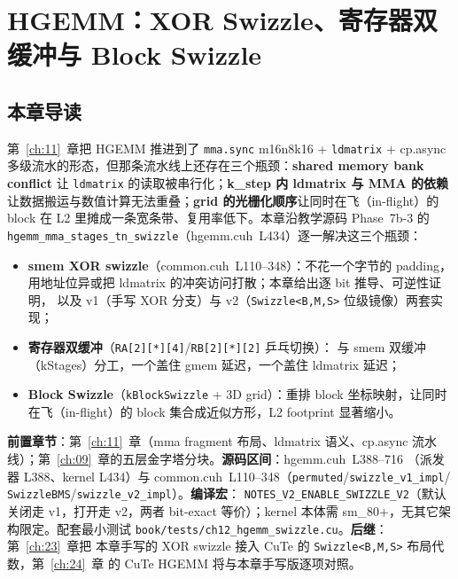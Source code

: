\chapter{HGEMM：XOR Swizzle、寄存器双缓冲与 Block Swizzle}\label{ch:12}

\section{本章导读}

第~\ref{ch:11}~章把 HGEMM 推进到了 \texttt{mma.sync} m16n8k16 + \texttt{ldmatrix} +
cp.async 多级流水的形态，但那条流水线上还存在三个瓶颈：\textbf{shared memory bank
conflict} 让 \texttt{ldmatrix} 的读取被串行化；\textbf{k\_step 内 ldmatrix 与 MMA
的依赖}让数据搬运与数值计算无法重叠；\textbf{grid 的光栅化顺序}让同时在飞（in-flight）的 block
在 L2 里摊成一条宽条带、复用率低下。本章沿教学源码 Phase~7b-3 的
\texttt{hgemm\_\allowbreak{}mma\_\allowbreak{}stages\_\allowbreak{}tn\_\allowbreak{}swizzle}（hgemm.cuh~L434）逐一解决这三个瓶颈：

\begin{itemize}
  \item \textbf{smem XOR swizzle}（common.cuh~L110--348）：不花一个字节的 padding，
        用地址位异或把 ldmatrix 的冲突访问打散；本章给出逐 bit 推导、可逆性证明，
        以及 v1（手写 XOR 分支）与 v2（\texttt{Swizzle\allowbreak{}<B,\allowbreak{}M,\allowbreak{}S>} 位级镜像）两套实现；
  \item \textbf{寄存器双缓冲}（\texttt{RA[2][*][4]}/\texttt{RB[2][*][2]} 乒乓切换）：
        与 smem 双缓冲（kStages）分工，一个盖住 gmem 延迟，一个盖住 ldmatrix 延迟；
  \item \textbf{Block Swizzle}（\texttt{k\allowbreak{}Block\allowbreak{}Swizzle} + 3D grid）：重排 block
        坐标映射，让同时在飞（in-flight）的 block 集合成近似方形，L2 footprint 显著缩小。
\end{itemize}

\textbf{前置章节}：第~\ref{ch:11}~章（mma fragment 布局、ldmatrix 语义、cp.async
流水线）；第~\ref{ch:09}~章的五层金字塔分块。\textbf{源码区间}：hgemm.cuh~L388--716
（派发器 L388、kernel L434）与 common.cuh~L110--348（\texttt{permuted}/\texttt{swizzle\_\allowbreak{}v1\_\allowbreak{}impl}/
\texttt{SwizzleBMS}/\texttt{swizzle\_\allowbreak{}v2\_\allowbreak{}impl}）。\textbf{编译宏}：
\texttt{NOTES\_\allowbreak{}V2\_\allowbreak{}ENABLE\_\allowbreak{}SWIZZLE\_\allowbreak{}V2}（默认关闭走 v1，打开走 v2，两者 bit-exact
等价）；kernel 本体需 sm\_80+，无其它架构限定。配套最小测试
\texttt{book/\allowbreak{}tests/\allowbreak{}ch12\_\allowbreak{}hgemm\_\allowbreak{}swizzle.cu}。\textbf{后继}：第~\ref{ch:23}~章把
本章手写的 XOR swizzle 接入 CuTe 的 \texttt{Swizzle\allowbreak{}<B,\allowbreak{}M,\allowbreak{}S>} 布局代数，第~\ref{ch:24}~章
的 CuTe HGEMM 将与本章手写版逐项对照。

